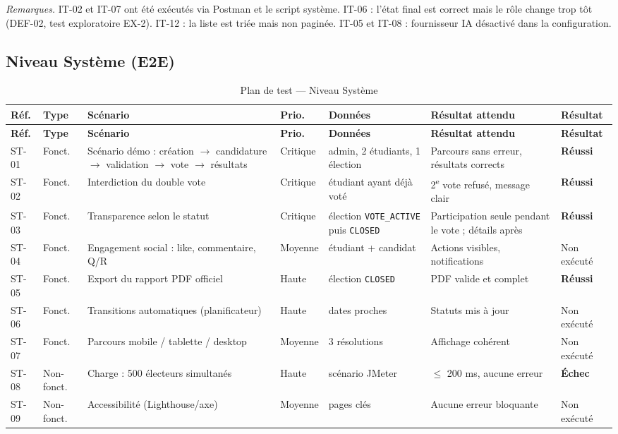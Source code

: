 \documentclass[12pt,a4paper]{report}
\newcommand{\ok}{\textcolor{okgreen}{\textbf{Réussi}}}
\newcommand{\ko}{\textcolor{kored}{\textbf{Échec}}}
\newcommand{\nex}{\textcolor{negray}{Non exécuté}}
\newcommand{\planHead}{\rowcolor{evlight}\textbf{Réf.} & \textbf{Type} & \textbf{Scénario} & \textbf{Prio.} & \textbf{Données} & \textbf{Résultat attendu} & \textbf{Résultat}}
\begin{document}
\textit{Remarques.} IT-02 et IT-07 ont été exécutés via Postman et le script système. IT-06 : l'état final est correct mais le rôle change trop tôt (DEF-02, test exploratoire EX-2). IT-12 : la liste est triée mais non paginée. IT-05 et IT-08 : fournisseur IA désactivé dans la configuration.

\subsection{Niveau Système (E2E)}

\begin{longtable}{@{}p{1.45cm}p{1.25cm}p{2.9cm}p{1.15cm}p{2.3cm}p{3.4cm}p{1.6cm}@{}}
\caption{Plan de test --- Niveau Système}\\
\toprule \planHead \\ \midrule \endfirsthead
\toprule \planHead \\ \midrule \endhead
\bottomrule \endlastfoot
ST-01 & Fonct. & Scénario démo : création $\rightarrow$ candidature $\rightarrow$ validation $\rightarrow$ vote $\rightarrow$ résultats & Critique & admin, 2 étudiants, 1 élection & Parcours sans erreur, résultats corrects & \ok\\
ST-02 & Fonct. & Interdiction du double vote & Critique & étudiant ayant déjà voté & 2\textsuperscript{e} vote refusé, message clair & \ok\\
ST-03 & Fonct. & Transparence selon le statut & Critique & élection \texttt{VOTE\_ACTIVE} puis \texttt{CLOSED} & Participation seule pendant le vote ; détails après & \ok\\
ST-04 & Fonct. & Engagement social : like, commentaire, Q/R & Moyenne & étudiant + candidat & Actions visibles, notifications & \nex\\
ST-05 & Fonct. & Export du rapport PDF officiel & Haute & élection \texttt{CLOSED} & PDF valide et complet & \ok\\
ST-06 & Fonct. & Transitions automatiques (planificateur) & Haute & dates proches & Statuts mis à jour & \nex\\
ST-07 & Fonct. & Parcours mobile / tablette / desktop & Moyenne & 3 résolutions & Affichage cohérent & \nex\\
ST-08 & Non-fonct. & Charge : 500 électeurs simultanés & Haute & scénario JMeter & $\leq$ 200 ms, aucune erreur & \ko\\
ST-09 & Non-fonct. & Accessibilité (Lighthouse/axe) & Moyenne & pages clés & Aucune erreur bloquante & \nex\\

\end{longtable}
\end{document}
